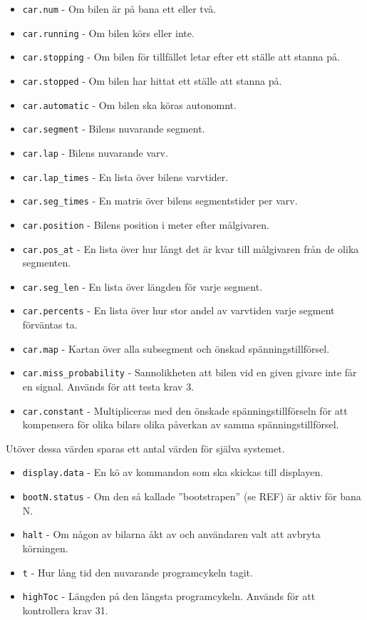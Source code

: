 \begin{itemize}

\item \texttt{car.num} - Om bilen är på bana ett eller två.
\item \texttt{car.running} - Om bilen körs eller inte.
\item \texttt{car.stopping} - Om bilen för tillfället letar efter ett ställe att stanna på.
\item \texttt{car.stopped} - Om bilen har hittat ett ställe att stanna på.
\item \texttt{car.automatic} - Om bilen ska köras autonomnt.
\item \texttt{car.segment} - Bilens nuvarande segment.
\item \texttt{car.lap} - Bilens nuvarande varv.
\item \texttt{car.lap\_times} - En lista över bilens varvtider.
\item \texttt{car.seg\_times} - En matris över bilens segmentstider per varv.
\item \texttt{car.position} - Bilens position i meter efter målgivaren.
\item \texttt{car.pos\_at} - En lista över hur långt det är kvar till målgivaren från de olika segmenten.
\item \texttt{car.seg\_len} - En lista över längden för varje segment.
\item \texttt{car.percents} - En lista över hur stor andel av varvtiden varje segment förväntas ta.
\item \texttt{car.map} - Kartan över alla subsegment och önskad spänningstillförsel.
\item \texttt{car.miss\_probability} - Sannolikheten att bilen vid en given givare inte får en signal. Används för att testa krav 3.
\item \texttt{car.constant} - Multipliceras med den önskade spänningstillförseln för att
	kompensera för olika bilars olika påverkan av samma spänningstillförsel.

\end{itemize}


Utöver dessa värden sparas ett antal värden för själva systemet.

\begin{itemize}

	\item \texttt{display.data} - En kö av kommandon som ska skickas till displayen.
	\item \texttt{bootN.status} - Om den så kallade ''bootstrapen'' (se REF) är aktiv för bana N.
	\item \texttt{halt} - Om någon av bilarna åkt av och användaren valt att avbryta körningen.
	\item \texttt{t} - Hur lång tid den nuvarande programcykeln tagit.
	\item \texttt{highToc} - Längden på den längsta programcykeln. Används för att kontrollera krav 31.

\end{itemize}
